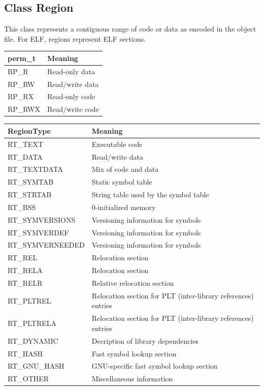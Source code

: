 \subsection{Class Region}


This class represents a contiguous range of code or data as encoded in the object file. For ELF, regions represent ELF sections.

\begin{center}
\begin{tabular}{ll}
\toprule
perm\_t & Meaning \\
\midrule
RP\_R & Read-only data \\
RP\_RW & Read/write data \\
RP\_RX & Read-only code \\
RP\_RWX & Read/write code \\
\bottomrule
\end{tabular}
\end{center}

\begin{center}
\begin{tabular}{ll}
\toprule
RegionType & Meaning \\
\midrule
RT\_TEXT & Executable code \\
RT\_DATA & Read/write data \\
RT\_TEXTDATA & Mix of code and data \\
RT\_SYMTAB & Static symbol table \\
RT\_STRTAB & String table used by the symbol table \\
RT\_BSS & 0-initialized memory \\
RT\_SYMVERSIONS & Versioning information for symbols \\
RT\_SYMVERDEF & Versioning information for symbols \\
RT\_SYMVERNEEDED & Versioning information for symbols \\
RT\_REL & Relocation section \\
RT\_RELA & Relocation section \\
RT\_RELR & Relative relocation section \\
RT\_PLTREL & Relocation section for PLT (inter-library references) entries \\
RT\_PLTRELA & Relocation section for PLT (inter-library references) entries \\
RT\_DYNAMIC & Decription of library dependencies \\
RT\_HASH & Fast symbol lookup section \\
RT\_GNU\_HASH & GNU-specific fast symbol lookup section \\
RT\_OTHER & Miscellaneous information \\
\bottomrule
\end{tabular}
\end{center}

